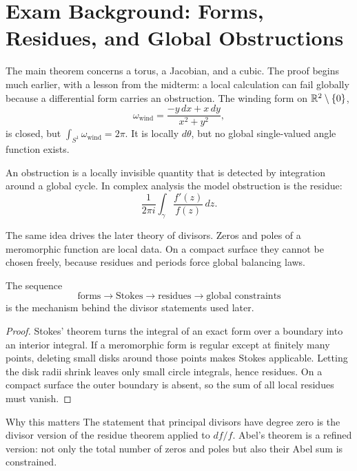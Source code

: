 \chapter[Exam Background]{Exam Background: Forms, Residues, and Global Obstructions}
\label{ch:exam-background}

The main theorem concerns a torus, a Jacobian, and a cubic.  The proof begins
much earlier, with a lesson from the midterm: a local calculation can fail
globally because a differential form carries an obstruction.
The winding form on \(\mathbb{R}^2\setminus\{0\}\),
\[
  \omega_{\mathrm{wind}}=\frac{-y\,dx+x\,dy}{x^2+y^2},
\]
is closed, but \(\int_{S^1}\omega_{\mathrm{wind}}=2\pi\).  It is locally
\(d\theta\), but no global single-valued angle function exists.

\begin{definition}
An obstruction is a locally invisible quantity that is detected by integration
around a global cycle.  In complex analysis the model obstruction is the residue:
\[
  \frac{1}{2\pi i}\int_\gamma \frac{f'(z)}{f(z)}\,dz.
\]
\end{definition}

The same idea drives the later theory of divisors.  Zeros and poles of a
meromorphic function are local data.  On a compact surface they cannot be chosen
freely, because residues and periods force global balancing laws.

\begin{proposition}
\label{prop:exam-mechanism}
The sequence
\[
  \text{forms} \longrightarrow \text{Stokes} \longrightarrow
  \text{residues} \longrightarrow \text{global constraints}
\]
is the mechanism behind the divisor statements used later.
\end{proposition}

\begin{proof}
Stokes' theorem turns the integral of an exact form over a boundary into an
interior integral.  If a meromorphic form is regular except at finitely many
points, deleting small disks around those points makes Stokes applicable.  Letting
the disk radii shrink leaves only small circle integrals, hence residues.  On a
compact surface the outer boundary is absent, so the sum of all local residues
must vanish.
\end{proof}

\begin{keyidea}{Why this matters}
The statement that principal divisors have degree zero is the divisor version of
the residue theorem applied to \(df/f\).  Abel's theorem is a refined version:
not only the total number of zeros and poles but also their Abel sum is
constrained.
\end{keyidea}

